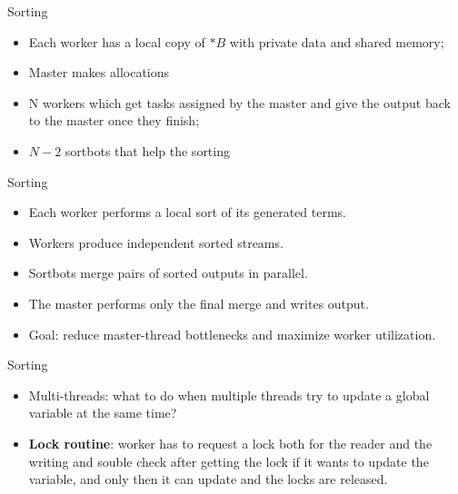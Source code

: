 \documentclass[11pt]{beamer}
\begin{document}
\begin{frame}{Sorting}
\begin{itemize}
\item Each worker has a local copy of $*B$ with private data and shared memory;
\item Master makes allocations
\item N workers which get tasks assigned by the master and give the output back to the master once they finish;
\item $N-2$ sortbots that help the sorting
\end{itemize}
\end{frame}









\begin{frame}{Sorting}
\begin{itemize}
    \item Each worker performs a local sort of its generated terms.
    \item Workers produce independent sorted streams.
    \item Sortbots merge pairs of sorted outputs in parallel.
    \item The master performs only the final merge and writes output.
    \item Goal: reduce master-thread bottlenecks and maximize worker utilization.
\end{itemize}

\end{frame}















\begin{frame}{Sorting}
\begin{itemize}
\item Multi-threads: what to do when multiple threads try to update a global variable at the same time?
\item \textbf{Lock routine}: worker has to request a lock both for the reader and the writing and souble check after getting the lock if it wants to update the variable, and only then it can update and the locks are released.
\end{itemize}
\end{frame}
\end{document}
